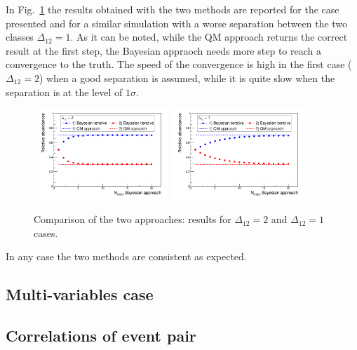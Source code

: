 In Fig.~\ref{fig:IterGaus2} the results obtained with the two methods are
reported for the case presented and for a similar simulation with a worse
separation between the two classes $\Delta_{12} = 1$.
As it can be noted, while the QM approach returns the correct result at the
first step, the Bayesian appraoch needs more step to reach a convergence to
the truth. The speed of the convergence is high in the first case
($\Delta_{12} = 2$) when a good separation is assumed, while it is quite slow
when the separation is at the level of $1\sigma$.

\begin{figure}[!htb]
\centering
\includegraphics[width=0.45\textwidth]{../png/figIterativeDelta2.png}
\includegraphics[width=0.45\textwidth]{../png/figIterativeDelta1.png}
\caption{Comparison of the two approaches: results for $\Delta_{12} = 2$ and
  $\Delta_{12} = 1$ cases.}
\label{fig:IterGaus2}
\end{figure}

In any case the two methods are consistent as expected.

\subsection{Multi-variables case}

\subsection{Correlations of event pair}

\newpage
